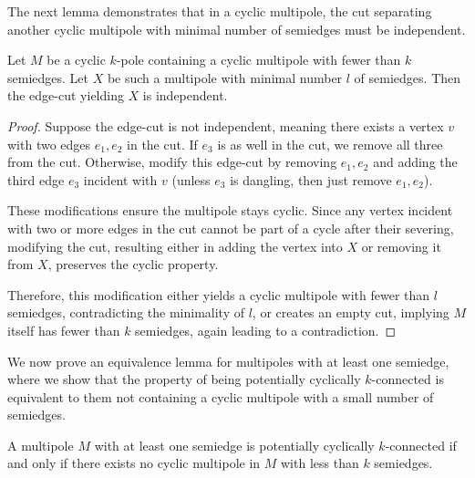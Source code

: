 \documentclass[12pt, twoside]{book}
\begin{document}
The next lemma demonstrates that in a cyclic multipole, the cut separating another cyclic multipole with minimal number of semiedges must be independent.

\begin{lemma}\label{lem:smallest-cut-in-mpoles-is-independent}
	Let $M$ be a cyclic $k$-pole containing a cyclic multipole with fewer than $k$ semiedges. Let $X$ be such a multipole with minimal number $l$ of semiedges. Then the edge-cut yielding $X$ is independent.
\end{lemma}

\begin{proof}
	Suppose the edge-cut is not independent, meaning there exists a vertex $v$ with two edges $e_1,e_2$ in the cut. If $e_3$ is as well in the cut, we remove all three from the cut. Otherwise, modify this edge-cut by removing $e_1,e_2$ and adding the third edge $e_3$ incident with $v$ (unless $e_3$ is dangling, then just remove $e_1,e_2$).
	
	These modifications ensure the multipole stays cyclic. Since any vertex incident with two or more edges in the cut cannot be part of a cycle after their severing, modifying the cut, resulting either in adding the vertex into $X$ or removing it from $X$, preserves the cyclic property.
	
	Therefore, this modification either yields a cyclic multipole with fewer than $l$ semiedges, contradicting the minimality of $l$, or creates an empty cut, implying $M$ itself has fewer than $k$ semiedges, again leading to a contradiction.
\end{proof}

We now prove an equivalence lemma for multipoles with at least one semiedge, where we show that the property of being potentially cyclically \mbox{$k$-connected} is equivalent to them not containing a cyclic multipole with a small number of semiedges.

\begin{lemma}
	A multipole $M$ with at least one semiedge is potentially cyclically $k$-connected if and only if  there exists no cyclic multipole in $M$ with less than $k$ semiedges.
\end{lemma}
\end{document}
